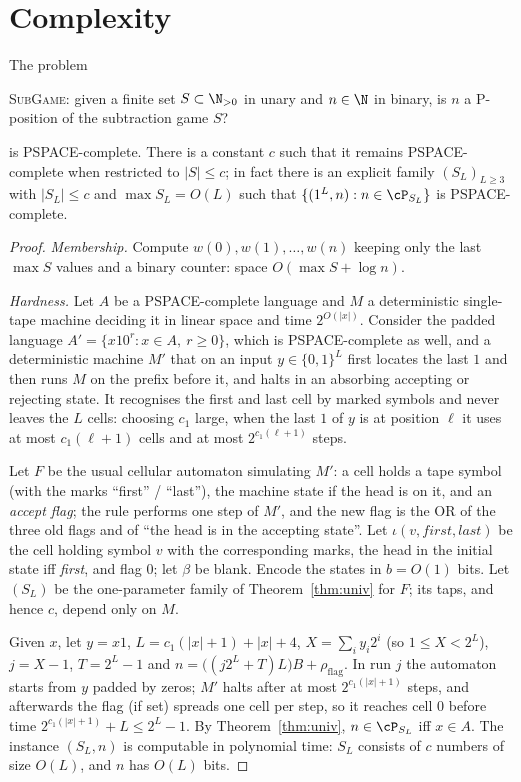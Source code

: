 \section{Complexity}\label{sec:complexity}

\begin{theorem}\label{thm:pspace}
The problem
\begin{center}
\textsc{SubGame}: given a finite set $S\subset\N_{>0}$ in unary and $n\in\N$ in binary, is $n$ a
P-position of the subtraction game $S$?
\end{center}
is PSPACE-complete.  There is a constant $c$ such that it remains PSPACE-complete when restricted to
$|S|\le c$; in fact there is an explicit family $(S_L)_{L\ge3}$ with $|S_L|\le c$ and $\max S_L=O(L)$
such that $\{(1^L,n): n\in\cP_{S_L}\}$ is PSPACE-complete.
\end{theorem}

\begin{proof}
\emph{Membership.}  Compute $w(0),w(1),\dots,w(n)$ keeping only the last $\max S$ values and a
binary counter: space $O(\max S+\log n)$.

\emph{Hardness.}  Let $A$ be a PSPACE-complete language and $M$ a deterministic single-tape machine
deciding it in linear space and time $2^{O(|x|)}$.  Consider the padded language
$A'=\{x10^r: x\in A,\ r\ge0\}$, which is PSPACE-complete as well, and a deterministic machine $M'$
that on an input $y\in\{0,1\}^L$ first locates the last $1$ and then runs $M$ on the prefix before it,
and halts in an absorbing accepting or rejecting state.  It recognises the first and last cell by
marked symbols and never leaves the $L$ cells: choosing $c_1$ large, when the last $1$ of $y$ is at
position $\ell$ it uses at most $c_1(\ell+1)$ cells and at most $2^{c_1(\ell+1)}$ steps.

Let $F$ be the usual cellular automaton simulating $M'$: a cell holds a tape symbol (with the marks
``first'' / ``last''), the machine state if the head is on it, and an \emph{accept flag}; the rule
performs one step of $M'$, and the new flag is the OR of the three old flags and of ``the head is in
the accepting state''.  Let $\iota(v,\textit{first},\textit{last})$ be the cell holding symbol $v$
with the corresponding marks, the head in the initial state iff \textit{first}, and flag $0$; let
$\beta$ be blank.  Encode the states in $b=O(1)$ bits.  Let $(S_L)$ be the one-parameter family of
Theorem~\ref{thm:univ} for $F$; its taps, and hence $c$, depend only on $M$.

Given $x$, let $y=x1$, $L=c_1(|x|+1)+|x|+4$, $X=\sum_i y_i2^i$ (so $1\le X<2^L$), $j=X-1$, $T=2^L-1$ and
$n=\bigl((j2^L+T)L\bigr)B+\rho_{\mathrm{flag}}$.  In run $j$ the automaton starts from $y$ padded by
zeros; $M'$ halts after at most $2^{c_1(|x|+1)}$ steps, and afterwards the flag (if set) spreads one
cell per step, so it reaches cell $0$ before time $2^{c_1(|x|+1)}+L\le 2^L-1$.  By
Theorem~\ref{thm:univ}, $n\in\cP_{S_L}$ iff $x\in A$.  The instance $(S_L,n)$ is computable in
polynomial time: $S_L$ consists of $c$ numbers of size $O(L)$, and $n$ has $O(L)$ bits.
\end{proof}

